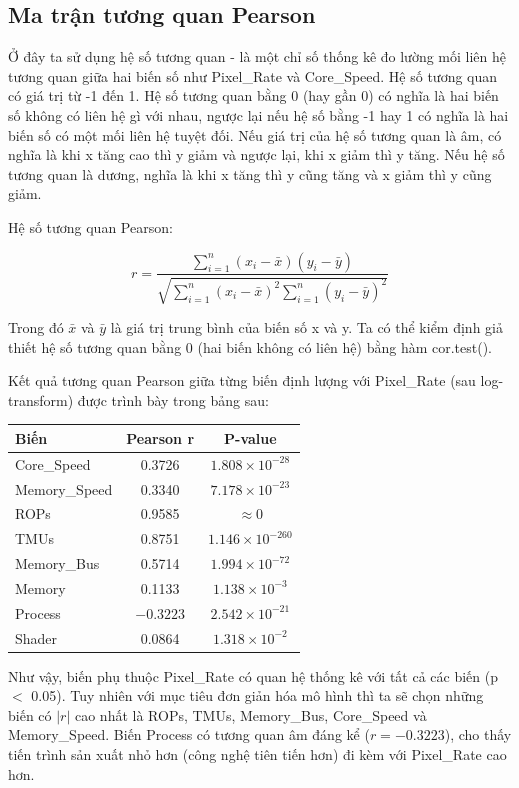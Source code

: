 \subsection{Ma trận tương quan Pearson}

Ở đây ta sử dụng hệ số tương quan - là một chỉ số thống kê đo lường mối liên hệ tương quan giữa hai biến số như Pixel\_Rate và Core\_Speed. Hệ số tương quan có giá trị từ -1 đến 1. Hệ số tương quan bằng 0 (hay gần 0) có nghĩa là hai biến số không có liên hệ gì với nhau, ngược lại nếu hệ số bằng -1 hay 1 có nghĩa là hai biến số có một mối liên hệ tuyệt đối. Nếu giá trị của hệ số tương quan là âm, có nghĩa là khi x tăng cao thì y giảm và ngược lại, khi x giảm thì y tăng. Nếu hệ số tương quan là dương, nghĩa là khi x tăng thì y cũng tăng và x giảm thì y cũng giảm.

Hệ số tương quan Pearson:

$$r = \frac{\sum_{i=1}^{n} (x_i - \bar{x})(y_i - \bar{y})}
{\sqrt{\sum_{i=1}^{n} (x_i - \bar{x})^2 \sum_{i=1}^{n} (y_i - \bar{y})^2}}
$$

Trong đó $\bar{x}$ và $\bar{y}$ là giá trị trung bình của biến số x và y.
Ta có thể kiểm định giả thiết hệ số tương quan bằng 0 (hai biến không có liên hệ) bằng hàm cor.test().

Kết quả tương quan Pearson giữa từng biến định lượng với Pixel\_Rate (sau log-transform) được trình bày trong bảng sau:

\begin{longtable}{|l|c|c|}
\hline
\textbf{Biến} & \textbf{Pearson r} & \textbf{P-value} \\
\hline
Core\_Speed    & 0.3726  & $1.808 \times 10^{-28}$ \\
\hline
Memory\_Speed  & 0.3340  & $7.178 \times 10^{-23}$ \\
\hline
ROPs           & 0.9585  & $\approx 0$ \\
\hline
TMUs           & 0.8751  & $1.146 \times 10^{-260}$ \\
\hline
Memory\_Bus    & 0.5714  & $1.994 \times 10^{-72}$ \\
\hline
Memory         & 0.1133  & $1.138 \times 10^{-3}$ \\
\hline
Process        & $-0.3223$ & $2.542 \times 10^{-21}$ \\
\hline
Shader         & 0.0864  & $1.318 \times 10^{-2}$ \\
\hline
\end{longtable}

Như vậy, biến phụ thuộc Pixel\_Rate có quan hệ thống kê với tất cả các biến (p $<$ 0.05). Tuy nhiên với mục tiêu đơn giản hóa mô hình thì ta sẽ chọn những biến có $|r|$ cao nhất là ROPs, TMUs, Memory\_Bus, Core\_Speed và Memory\_Speed. Biến Process có tương quan âm đáng kể ($r = -0.3223$), cho thấy tiến trình sản xuất nhỏ hơn (công nghệ tiên tiến hơn) đi kèm với Pixel\_Rate cao hơn.


